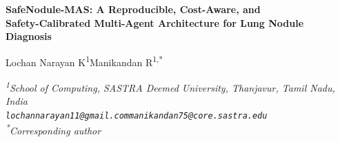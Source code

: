 \documentclass[12pt]{article}
\begin{document}
\thispagestyle{plain}

\begin{center}
{\LARGE\bfseries SafeNodule-MAS: A Reproducible, Cost-Aware, and\\[3pt]
Safety-Calibrated Multi-Agent Architecture for Lung Nodule Diagnosis\par}
\vspace{16pt}
{\large
Lochan Narayan K\textsuperscript{1}\quad Manikandan R\textsuperscript{1,*}\par}
\vspace{6pt}
{\small\itshape
\textsuperscript{1}School of Computing, SASTRA Deemed University, Thanjavur, Tamil Nadu, India\\
\upshape\texttt{lochannarayan11@gmail.com}\qquad\texttt{manikandan75@core.sastra.edu}\\
\upshape\textsuperscript{*}Corresponding author\par}
\vspace{16pt}
\end{center}
\end{document}
